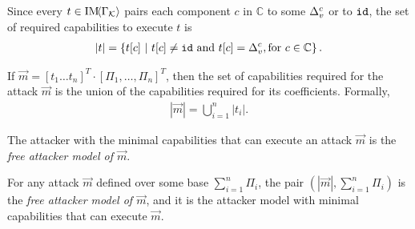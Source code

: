 {{\begin{corollary}
\label{cor:CPSRobustness:Capabilities}
Since every $t\in \text{IM}\!{{\left<\Gamma_{\mathcal{K}}\right>}}$ pairs each component $c$ in $\mathbb{C}$ to some ${\Delta}^{c}_{v}$ or to ${\texttt{id}}$, 
the set of required capabilities to execute $t$ is 
\begin{align}
  |t|=\left\{t[c]\ |\ t[c]\neq {\texttt{id}} \text{ and } t[c]={\Delta}^{c}_{v}, \text{for $c\in \mathbb{C}$}\right\}.
\end{align}
\end{corollary}
\begin{corollary}
  \label{cor:CPSRobustness:GeneralCapabilities}
If $\vec{m}=[t_1\ldots t_n]^T\cdot[\Pi_1, \ldots, \Pi_n]^T$, then the set of capabilities required for the attack $\vec{m}$ is the union of the capabilities required for its coefficients. Formally, 
\begin{align}
  |\vec{m}|=\bigcup_{i=1}^n|t_i|.
\end{align}
\end{corollary}
The attacker with the minimal capabilities that can execute an attack $\vec{m}$ is the \emph{free attacker model of $\vec{m}$}.
\begin{definition}
 For any attack $\vec{m}$ defined over some base $\sum_{i=1}^n\Pi_i$, the pair $(|\vec{m}|, \sum_{i=1}^n\Pi_i)$ is the \emph{free attacker model of $\vec{m}$}, and it is the attacker model with minimal capabilities that can execute $\vec{m}$.
  \end{definition}

}}
